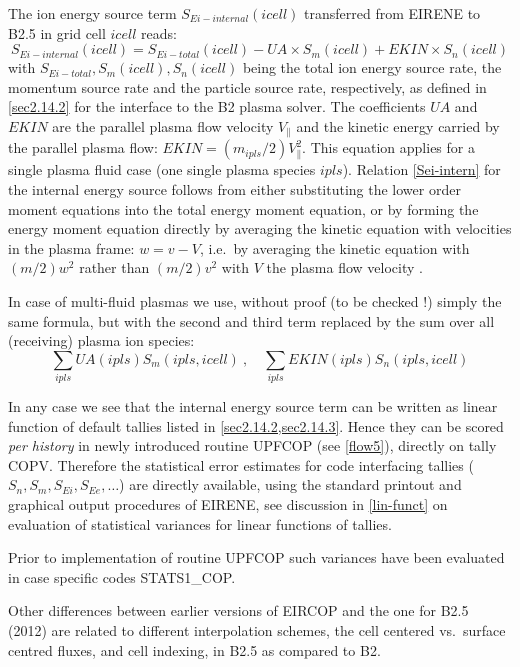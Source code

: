 The ion energy source term $S_{Ei-internal}(icell)$ transferred from EIRENE to
B2.5 in grid cell $icell$ reads:
\begin{equation}
  \label{Sei-intern}
  S_{Ei-internal}(icell)= S_{Ei-total}(icell) - UA \times S_m(icell) + EKIN
  \times S_n(icell)
\end{equation}
with $S_{Ei-total}, S_m(icell), S_n(icell)$
being the total ion energy source rate, the momentum source rate and the
particle source rate, respectively, as defined in \cref{sec2.14.2} for the
interface to the B2 plasma solver.
The coefficients $UA$ and $EKIN$ are the parallel plasma flow velocity
$V_\parallel$ and the kinetic energy carried by the parallel plasma flow: $EKIN
  = (m_{ipls}/2) V_\parallel^2$.
This equation applies for a single plasma fluid case (one single plasma species
$ipls$).
Relation \cref{Sei-intern} for the internal energy source follows from either
substituting the lower order moment equations into the total energy moment
equation, or by forming the energy moment equation directly by averaging the
kinetic equation with velocities in the plasma frame:
$w = v - V$, i.e.\ by averaging the kinetic equation with $(m/2) w^2$ rather
than $(m/2) v^2$ with $V$ the plasma flow velocity \cite{kn:Mueller}.

In case of multi-fluid plasmas we use, without proof  (to be checked !) simply
the same formula, but with the second and third term replaced by the sum over
all (receiving) plasma ion species:
\begin{equation}
  \sum_{ipls}
  UA(ipls) S_m(ipls,icell) \ , \quad \sum_{ipls} EKIN(ipls) S_n(ipls,icell)
\end{equation}

In any case we see that the internal energy source term can be written as
linear function of default tallies listed in \cref{sec2.14.2,sec2.14.3}.
Hence they can be scored \emph{per history} in newly introduced routine UPFCOP
(see \cref{flow5}), directly on tally COPV.
Therefore the statistical error estimates for code interfacing tallies ($S_n,
  S_m, S_{Ei}, S_{Ee}, \dots$) are directly available, using the standard
printout and graphical output procedures of EIRENE, see discussion in
\cref{lin-funct} on evaluation of statistical variances for linear functions of
tallies.

Prior to implementation of routine UPFCOP such variances have been evaluated in
case specific codes STATS1\_COP.

Other differences between earlier versions of EIRCOP and the one for B2.5
(2012) are related to different interpolation schemes, the cell centered vs.\
surface centred fluxes, and cell indexing, in B2.5 as compared to B2.
